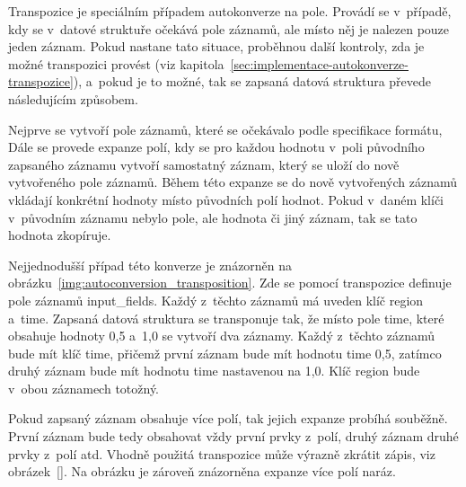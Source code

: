 \documentclass[FM,bw,DP]{tulthesis}
\begin{document}
Transpozice je speciálním případem autokonverze na pole. Provádí se v~případě, kdy se v~datové struktuře očekává pole záznamů, ale místo něj je nalezen pouze jeden záznam. Pokud nastane tato situace, proběhnou další kontroly, zda je možné transpozici provést (viz kapitola~\ref{sec:implementace-autokonverze-transpozice}), a~pokud je to možné, tak se zapsaná datová struktura převede následujícím způsobem.

Nejprve se vytvoří pole záznamů, které se očekávalo podle specifikace formátu, Dále se provede expanze polí, kdy se pro každou hodnotu v~poli původního zapsaného záznamu vytvoří samostatný záznam, který se uloží do nově vytvořeného pole záznamů. Během této expanze se do nově vytvořených záznamů vkládají konkrétní hodnoty místo původních polí hodnot. Pokud v~daném klíči v~původním záznamu nebylo pole, ale hodnota či jiný záznam, tak se tato hodnota zkopíruje.

Nejjednodušší případ této konverze je znázorněn na obrázku~\ref{img:autoconversion_transposition}. Zde se pomocí transpozice definuje pole záznamů input\_fields. Každý z~těchto záznamů má uveden klíč region a~time. Zapsaná datová struktura se transponuje tak, že místo pole time, které obsahuje hodnoty 0,5 a~1,0 se vytvoří dva záznamy. Každý z~těchto záznamů bude mít klíč time, přičemž první záznam bude mít hodnotu time 0,5, zatímco druhý záznam bude mít hodnotu time nastavenou na 1,0. Klíč region bude v~obou záznamech totožný.

Pokud zapsaný záznam obsahuje více polí, tak jejich expanze probíhá souběžně. První záznam bude tedy obsahovat vždy první prvky z~polí, druhý záznam druhé prvky z~polí atd. Vhodně použitá transpozice může výrazně zkrátit zápis, viz obrázek~\ref{}. Na obrázku je zároveň znázorněna expanze více polí naráz.

\lstset{style=code}
\end{document}
